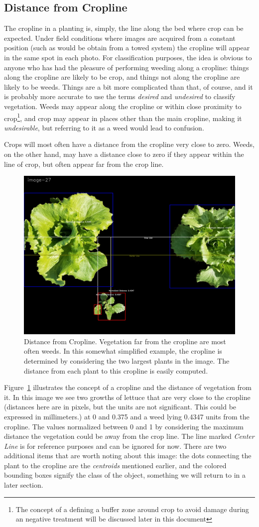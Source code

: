 \documentclass[letterpaper]{article}
\begin{document}
{\subsection{Distance from Cropline}
The cropline in a planting is, simply, the line along the bed where crop can be expected. Under field conditions where images are acquired from a constant position (such as would be obtain from a towed system) the cropline will appear in the same spot in each photo. For classification purposes, the idea is obvious to anyone who has had the pleasure of performing weeding along a cropline: things along the cropline are likely to be crop, and things not along the cropline are likely to be weeds. Things are a bit more complicated than that, of course, and it is probably more accurate to use the terms \textit{desired} and \textit{undesired} to classify vegetation. Weeds may appear along the cropline or within close proximity to crop\footnote{The concept of a defining a buffer zone around crop to avoid damage during an negative treatment will be discussed later in this document}, and crop may appear in places other than the main cropline, making it \textit{undesirable}, but referring to it as a weed would lead to confusion.

Crops will most often have a distance from the cropline very close to zero. Weeds, on the other hand, may have a distance close to zero if they appear within the line of crop, but often appear far from the crop line.
\begin{figure}[h!]
	\centering
	\includegraphics[width=0.4\linewidth]{./figures/normalized-distance.jpg}
	\caption[Distance from Cropline]{Distance from Cropline. Vegetation far from the cropline are most often weeds. In this somewhat simplified example, the cropline is determined by considering the two largest plants in the image. The distance from each plant to this cropline is easily computed.}
	\label{fig:normalized-distance}
\end{figure}
Figure~\ref{fig:normalized-distance} illustrates the concept of a cropline and the distance of vegetation from it. In this image we see two growths of lettuce that are very close to the cropline (distances here are in pixels, but the units are not significant. This could be expressed in millimeters.) at 0 and 0.375 and a weed lying 0.4347 units from the cropline. The values normalized between 0 and 1 by considering the maximum distance the vegetation could be away from the crop line. The line marked \textit{Center Line} is for reference purposes and can be ignored for now.  There are two additional items that are worth noting about this image: the dots connecting the plant to the cropline are the {\it centroids} mentioned earlier, and the colored bounding boxes signify the class of the object, something we will return to in a later section.

}
\end{document}
